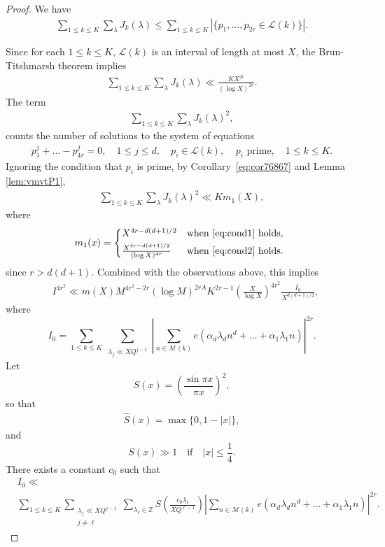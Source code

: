 \documentclass[10pt,a4paper]{amsart}
\def\Z{{\mathbb Z}}
\def\cL{{\mathcal L}}
\def\cM{{\mathcal M}}
\def\le{\leqslant}
\begin{document}
\begin{proof}
We have 
\begin{align*}
\sum_{1\le k \le K}\sum_{\lambda} J_k(\lambda)\le \sum_{1\le k \le K}|\{ p_1,\dots,p_{2r}\in \cL(k)\}|.
\end{align*}



Since for each $1\le k \le K$,  $\cL(k)$ is an interval of length at most $X$, the Brun-Titshmarsh theorem implies 
\begin{align*}
\sum_{1\le k \le K}\sum_{\lambda} J_k(\lambda)\ll \frac{KX^{2r}}{(\log{X})^{2r}}.
\end{align*}
The term
\begin{align*}
\sum_{1\le k \le K}\sum_{\lambda} J_k(\lambda)^2,
\end{align*}
counts the number of solutions to the system of equations 
\begin{align}
\label{eq:123456-1}
p_1^{j}+\dots-p_{4r}^{j}=0, \quad 1\le j \le d, \quad p_i\in \cL(k), \ \ \text{ $p_i$ prime}, \quad 1\le k \le K.
\end{align}
Ignoring the condition that $p_i$ is prime, by Corollary~\ref{eq:cor76867} and Lemma \ref{lem:vmvtP1},
\begin{align*}
\sum_{1\le k \le K}\sum_{\lambda} J_k(\lambda)^2\ll K m_1(X), 
\end{align*}
where
$$m_1(x)=\begin{cases*}
X^{4r-d(d+1)/2}& \textit{when} \eqref{eq:cond1} \textit{holds},\\
\frac{X^{4r-d(d+1)/2}}{(\log X)^{4r}} & \textit{when} \eqref{eq:cond2} \textit{holds}.
\end{cases*} $$
since $r>d(d+1)$. Combined with the observations above, this implies 
\begin{align}
\label{eq:II0}
& I^{4r^2}\ll m(X) M^{4r^2-2r}(\log{M})^{2rA}K^{2r-1}\left(\frac{X}{\log{X}}\right)^{4r^2}\frac{I_0}{X^{d(d+1)/2}},
\end{align}
where 
$$I_0=\sum_{1\le k \le K}\sum_{\substack{ \lambda_j \ll XQ^{j-1}}}\left|\sum_{n\in \cM(k)}e(\alpha_d\lambda_d n^{d}+\dots+\alpha_1\lambda_1 n)\right|^{2r}.$$
Let 
$$S(x)=\left(\frac{\sin{\pi x}}{\pi x}\right)^2,$$
so that 
\begin{align}
\label{eq:Shat}
\widehat S(x)=\max\{0,1-|x|\},
\end{align}
and 
$$S(x) \gg 1 \quad \text{if} \quad |x|\le \frac{1}{4}.$$
There exists a constant $c_0$ such that 
\begin{align*}
&I_0\ll \\ & \sum_{1\le k \le K}\sum_{\substack{ \lambda_j \ll XQ^{j-1} \\  j\neq \ell}}\sum_{\lambda_{\ell}\in \Z}S\left(\frac{c_0\lambda_{\ell}}{XQ^{\ell-1}}\right)\left|\sum_{n\in \cM(k)}e(\alpha_d\lambda_d n^{d}+\dots+\alpha_1\lambda_1 n)\right|^{2r}.
\end{align*}


\end{proof}
\end{document}
